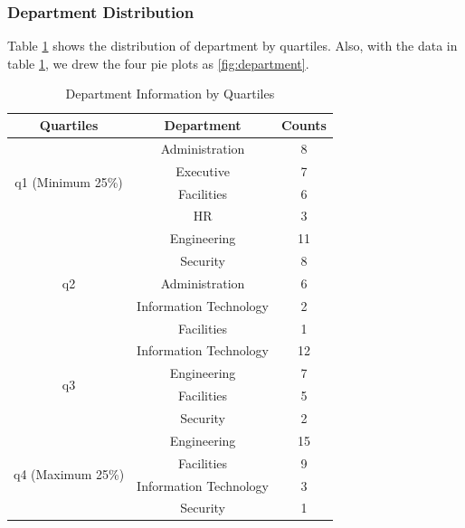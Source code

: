 \documentclass[aps, 10pt, a4paper]{article}
\begin{document}
            \subsubsection{Department Distribution}
                Table \ref{tb:movequantile} shows the distribution of department by quartiles. Also, with the data in table \ref{tb:movequantile}, we drew the four pie plots as \ref{fig:department}.
                
                \begin{table}[htbp]
                    \centering
                    \caption{Department Information by Quartiles}
                    \label{tb:movequantile}
                    \begin{tabular}{c|cc}
                        Quartiles & Department & Counts \\ \hline
                        \multirow{4}{*}{q1 (Minimum 25\%)} & Administration & 8 \\
                        & Executive & 7 \\
                        & Facilities & 6 \\
                        & HR & 3 \\ \hline
                        \multirow{5}{*}{q2} & Engineering & 11 \\
                        & Security & 8 \\
                        & Administration & 6 \\
                        & Information Technology & 2 \\
                        & Facilities & 1 \\ \hline
                        \multirow{4}{*}{q3} & Information Technology & 12 \\
                        & Engineering & 7 \\
                        & Facilities & 5 \\
                        & Security & 2 \\ \hline
                        \multirow{4}{*}{q4 (Maximum 25\%)} & Engineering & 15 \\
                        & Facilities & 9 \\
                        & Information Technology & 3 \\
                        & Security & 1 \\
                    \end{tabular}
                \end{table}
                
\end{document}
